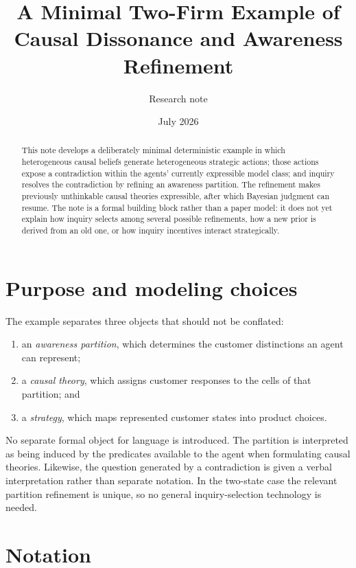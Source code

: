 \documentclass[11pt]{article}
\title{A Minimal Two-Firm Example of\\
Causal Dissonance and Awareness Refinement}
\author{Research note}
\date{July 2026}
\begin{document}
\maketitle

\begin{abstract}
This note develops a deliberately minimal deterministic example in which heterogeneous causal beliefs generate heterogeneous strategic actions; those actions expose a contradiction within the agents' currently expressible model class; and inquiry resolves the contradiction by refining an awareness partition.  The refinement makes previously unthinkable causal theories expressible, after which Bayesian judgment can resume.  The note is a formal building block rather than a paper model: it does not yet explain how inquiry selects among several possible refinements, how a new prior is derived from an old one, or how inquiry incentives interact strategically.
\end{abstract}

\section{Purpose and modeling choices}

The example separates three objects that should not be conflated:
\begin{enumerate}[label=(\roman*)]
  \item an \emph{awareness partition}, which determines the customer distinctions an agent can represent;
  \item a \emph{causal theory}, which assigns customer responses to the cells of that partition; and
  \item a \emph{strategy}, which maps represented customer states into product choices.
\end{enumerate}
No separate formal object for language is introduced.  The partition is interpreted as being induced by the predicates available to the agent when formulating causal theories.  Likewise, the question generated by a contradiction is given a verbal interpretation rather than separate notation.  In the two-state case the relevant partition refinement is unique, so no general inquiry-selection technology is needed.

\section{Notation}
\end{document}

